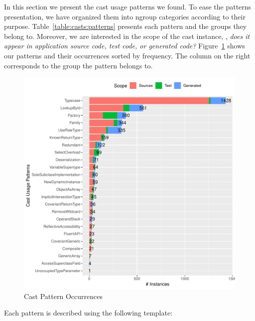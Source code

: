 In this section we present the cast usage patterns we found.
To ease the patterns presentation,
%
%
we have organized them into ngroup{} categories according to their purpose.
Table~\ref{table:casts:patterns} presents each pattern and the groups they belong to.
Moreover, we are interested in the scope of the cast instance,
\ie, \emph{does it appear in application source code, test code, or generated code?}
%
%
Figure~\ref{fig:patterns} shows our patterns and their occurrences sorted by frequency.
The column on the right corresponds to the group the pattern belongs to.





\begin{figure}[ht!]
\centering
\includegraphics[width=\textwidth]{analysis/table-patterns.pdf}
\caption{Cast Pattern Occurrences} \label{fig:patterns}
\end{figure}

Each pattern is described using the following template:

